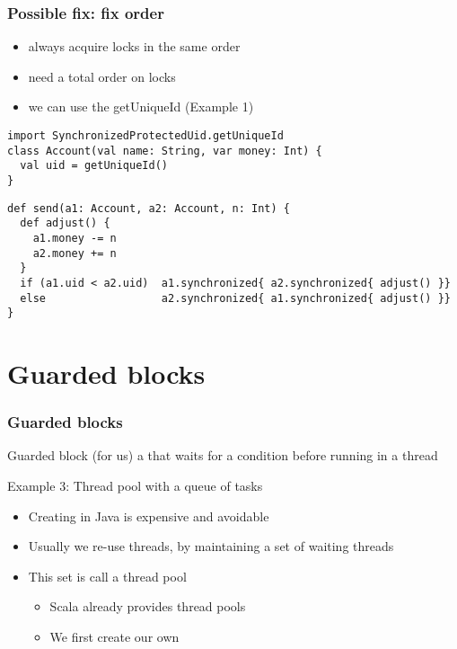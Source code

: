 \documentclass[aspectratio=169]{beamer}
\begin{document}
\begin{frame}[fragile]\frametitle{Possible fix: fix order}

\begin{itemize}
  \item always acquire locks in the same order
  \item need a total order on locks
  \item we can use the getUniqueId (Example 1)
\end{itemize}
    
\begin{lstlisting}[emph={getUniqueId,sleep,log,thread,join,synchronized}]
import SynchronizedProtectedUid.getUniqueId
class Account(val name: String, var money: Int) {
  val uid = getUniqueId()
}
\end{lstlisting}
\pause
\begin{lstlisting}[emph={assert,sleep,log,thread,join,synchronized}]
def send(a1: Account, a2: Account, n: Int) {
  def adjust() {
    a1.money -= n
    a2.money += n
  }
  if (a1.uid < a2.uid)  a1.synchronized{ a2.synchronized{ adjust() }}
  else                  a2.synchronized{ a1.synchronized{ adjust() }}
}
\end{lstlisting}
\end{frame}

\section{Guarded blocks}

\begin{frame}\frametitle{Guarded blocks}
\begin{alertblock}{Guarded block (for us)}
  a  that \alert{waits for a condition} before running in a thread
\end{alertblock}

\begin{block}{Example 3: Thread pool with a queue of tasks}
  \begin{itemize}
    \item Creating  in Java is \alert{expensive} and \alert{avoidable}
    \item Usually we re-use threads, by maintaining a set of waiting threads
    \item This set is call a thread pool
      \begin{itemize}
        \item Scala already provides thread pools
        \item We first create our own
      \end{itemize}
  \end{itemize}
\end{block}
\end{frame}
\end{document}
